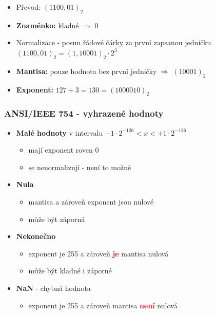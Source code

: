 \begin{frame}
    \begin{itemize}
      \item Převod: $(1100,01)_2$
      \item \textbf{Znaménko:} kladné $\Rightarrow$ $0$
      \item Normalizace - posun řádové čárky za první zapsanou jedničku \\
      $(1100,01)_2 = (1,10001)_2 \cdot 2^{3} $
      \item \textbf{Mantisa:} pouze hodnota bez první jedničky $\Rightarrow$ $(10001)_2$
      \item \textbf{Exponent:} $127 + 3 = 130 = (1000010)_2$
    \end{itemize}

	\end{frame}
  
  \begin{frame}
    \frametitle{ANSI/IEEE 754 - vyhrazené hodnoty}
    \boldmath
    
    \begin{itemize}
      \item \textbf{Malé hodnoty} v intervalu $-1\cdot 2^{-126} < x < +1\cdot 2^{-126}$
        \begin{itemize}
          \item mají exponent roven 0
          \item se nenormalizují - není to možné
        \end{itemize}
        
       \item \textbf{Nula}
        \begin{itemize}
          \item mantisa a zároveň exponent jsou nulové
          \item může být záporná
        \end{itemize}
        
       \item \textbf{Nekonečno}
        \begin{itemize}
          \item exponent je 255 a zároveň \textcolor{red}{\textbf{je}} mantisa nulová
          \item může být kladné i záporné
        \end{itemize}
        
       \item \textbf{NaN} - chybná hodnota
        \begin{itemize}
          \item exponent je 255 a zároveň mantisa \textcolor{red}{\textbf{není}} nulová
        \end{itemize}
    \end{itemize}
   
	\end{frame}

